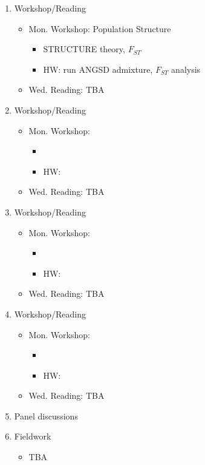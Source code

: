 \documentclass[]{article}
\begin{document}
\begin{enumerate}
\item Workshop/Reading
	\begin{itemize}
	\item Mon. Workshop: Population Structure
		\begin{itemize}
		\item STRUCTURE theory, $F_{ST}$ 
		\item HW: run ANGSD admixture, $F_{ST}$ analysis
		\end{itemize}
	\item Wed. Reading: TBA
\end{itemize}

\item Workshop/Reading
	\begin{itemize}
	\item Mon. Workshop: 
		\begin{itemize}
		\item 
		\item HW: 
		\end{itemize}
	\item Wed. Reading: TBA
\end{itemize}

\item Workshop/Reading
	\begin{itemize}
	\item Mon. Workshop: 
		\begin{itemize}
		\item 
		\item HW: 
		\end{itemize}
	\item Wed. Reading: TBA
\end{itemize}

\item Workshop/Reading
	\begin{itemize}
	\item Mon. Workshop: 
		\begin{itemize}
		\item 
		\item HW: 
		\end{itemize}
	\item Wed. Reading: TBA
\end{itemize}

\item Panel discussions

\item Fieldwork
\begin{itemize}
\item TBA
\end{itemize}


\end{enumerate}
\end{document}
